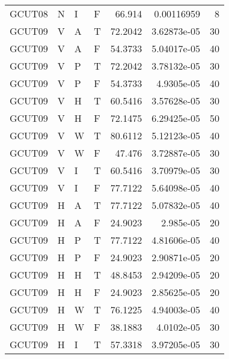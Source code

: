 \begin{longtable}{llllrrr}
    GCUT08   & N         & I         & F          & 66.914     & 0.00116959  & 8        \\
    GCUT09   & V         & A         & T          & 72.2042    & 3.62873e-05 & 30       \\
    GCUT09   & V         & A         & F          & 54.3733    & 5.04017e-05 & 40       \\
    GCUT09   & V         & P         & T          & 72.2042    & 3.78132e-05 & 30       \\
    GCUT09   & V         & P         & F          & 54.3733    & 4.9305e-05  & 40       \\
    GCUT09   & V         & H         & T          & 60.5416    & 3.57628e-05 & 30       \\
    GCUT09   & V         & H         & F          & 72.1475    & 6.29425e-05 & 50       \\
    GCUT09   & V         & W         & T          & 80.6112    & 5.12123e-05 & 40       \\
    GCUT09   & V         & W         & F          & 47.476     & 3.72887e-05 & 30       \\
    GCUT09   & V         & I         & T          & 60.5416    & 3.70979e-05 & 30       \\
    GCUT09   & V         & I         & F          & 77.7122    & 5.64098e-05 & 40       \\
    GCUT09   & H         & A         & T          & 77.7122    & 5.07832e-05 & 40       \\
    GCUT09   & H         & A         & F          & 24.9023    & 2.985e-05   & 20       \\
    GCUT09   & H         & P         & T          & 77.7122    & 4.81606e-05 & 40       \\
    GCUT09   & H         & P         & F          & 24.9023    & 2.90871e-05 & 20       \\
    GCUT09   & H         & H         & T          & 48.8453    & 2.94209e-05 & 20       \\
    GCUT09   & H         & H         & F          & 24.9023    & 2.85625e-05 & 20       \\
    GCUT09   & H         & W         & T          & 76.1225    & 4.94003e-05 & 40       \\
    GCUT09   & H         & W         & F          & 38.1883    & 4.0102e-05  & 30       \\
    GCUT09   & H         & I         & T          & 57.3318    & 3.97205e-05 & 30       \\

\end{longtable}
